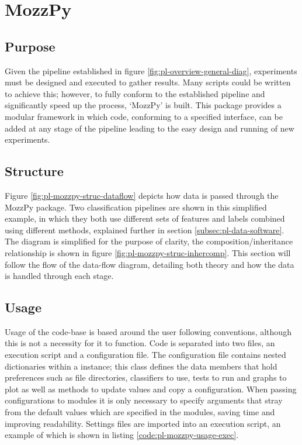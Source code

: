 \section{MozzPy}
\label{sec:pl-mozzpy}
    \subsection{Purpose}
    \label{subsec:pl-mozzpy-purp}
        Given the pipeline established in figure \ref{fig:pl-overview-general-diag}, experiments must be designed and executed to gather results. Many scripts could be written to achieve this; however, to fully conform to the established pipeline and significantly speed up the process, `MozzPy' is built. This package provides a modular framework in which code, conforming to a specified interface, can be added at any stage of the pipeline leading to the easy design and running of new experiments.
    
    \subsection{Structure}
    \label{subsec:pl-mozzpy-struc}
        
        
        Figure \ref{fig:pl-mozzpy-struc-dataflow} depicts how data is passed through the MozzPy package. Two classification pipelines are shown in this simplified example, in which they both use different sets of features and labels combined using different methods, explained further in section \ref{subsec:pl-data-software}. The diagram is simplified for the purpose of clarity, the composition/inheritance relationship is shown in figure \ref{fig:pl-mozzpy-struc-inhercomp}. This section will follow the flow of the data-flow diagram, detailing both theory and how the data is handled through each stage.
  
        
    
    \subsection{Usage}
    \label{subsec:pl-mozzpy-usage}
        Usage of the code-base is based around the user following conventions, although this is not a necessity for it to function. Code is separated into two files, an execution script and a configuration file. The configuration file contains nested dictionaries within a  instance; this class defines the data members that hold preferences such as file directories, classifiers to use, tests to run and graphs to plot as well as methods to update values and copy a configuration. When passing configurations to modules it is only necessary to specify arguments that stray from the default values which are specified in the modules, saving time and improving readability. Settings files are imported into an execution script, an example of which is shown in listing \ref{code:pl-mozzpy-usage-exec}.

